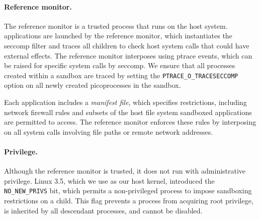 \paragraph{Reference monitor.}
The reference monitor is a trusted process that runs on the host system.
\graphene{} applications are launched by the reference monitor,
which instantiates the seccomp filter and traces all children
to check host system calls that could have external effects.
The reference monitor interposes using ptrace events, 
which can be raised for specific system calls by seccomp.
We ensure that all processes created within a sandbox are traced
by setting the {\tt PTRACE\_O\_TRACESECCOMP} option on all newly created picoprocesses
in the sandbox.


Each application includes a \emph{manifest file}, which specifies restrictions,
including network firewall rules and subsets of the host file system sandboxed
applications are permitted to access.  The reference monitor enforces these
rules by interposing on all system calls involving file paths or remote network addresses.

\paragraph{Privilege.~} 
Although the reference monitor is trusted, it does not run 
with administrative privilege.
Linux 3.5, which we use as our host kernel, 
introduced the {\tt NO\_NEW\_PRIVS} bit, which permits
a non-privileged process to impose sandboxing restrictions on a child.
This flag prevents a process from acquiring root privilege, %
is inherited by all descendant processes,
and cannot be disabled.

